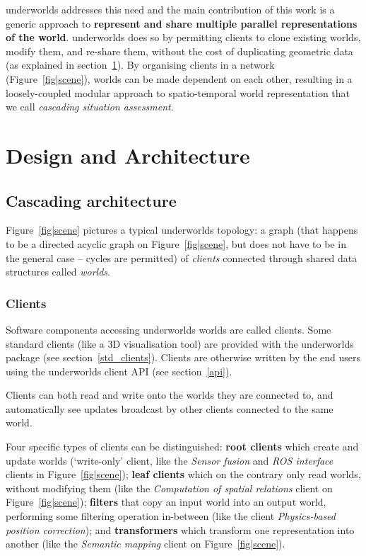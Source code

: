 \documentclass[conference]{IEEEtran}
\newcommand{\uwds}{{\sc underworlds}\xspace}
\begin{document}
\uwds addresses this need and the main contribution of this work is a generic
approach to \textbf{represent and share multiple parallel representations of the
world}. \uwds does so by permitting clients to clone existing worlds, modify
them, and re-share them, without the cost of duplicating geometric data (as
explained in section~\ref{design}). By organising clients in a network
(Figure~\ref{fig|scene}), worlds can be made dependent on each other, resulting
in a loosely-coupled modular approach to spatio-temporal world representation
that we call \emph{cascading situation assessment}.


\section{Design and Architecture}
\label{design}

\subsection{Cascading architecture}

Figure~\ref{fig|scene} pictures a typical \uwds topology: a graph (that
happens to be a directed acyclic graph on Figure~\ref{fig|scene}, but does not
have to be in the general case -- cycles are permitted) of \emph{clients}
connected through shared data structures called \emph{worlds}.

\subsubsection{Clients}

Software components accessing \uwds worlds are called clients. Some standard
clients (like a 3D visualisation tool) are provided with the \uwds package (see
section~\ref{std_clients}). Clients are otherwise written by the end users
using the \uwds client API (see section~\ref{api}).

Clients can both read and write onto the worlds they are connected to, and
automatically see updates broadcast by other clients connected to the same
world.

Four specific types of clients can be distinguished: \textbf{root clients} which
create and update worlds (`write-only' client, like the \emph{Sensor fusion} and
\emph{ROS interface} clients in Figure~\ref{fig|scene}); \textbf{leaf clients}
which on the contrary only read worlds, without modifying them (like the
\emph{Computation of spatial relations} client on Figure~\ref{fig|scene});
\textbf{filters} that copy an input world into an output world, performing
some filtering operation in-between (like the client \textit{Physics-based
position correction}); and \textbf{transformers} which transform one
representation into another (like the \emph{Semantic mapping} client on
Figure~\ref{fig|scene}).
\end{document}
